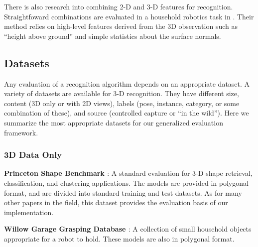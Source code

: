 There is also research into combining 2-D and 3-D features for recognition.
Straightfoward combinations are evaluated in a household robotics task in \cite{Gould2008}.
Their method relies on high-level features derived from the 3D observation such as ``height above ground'' and simple statistics about the surface normals.


\subsection{Datasets}
Any evaluation of a recognition algorithm depends on an appropriate dataset.
A variety of datasets are available for 3-D recognition.
They have different size, content (3D only or with 2D views), labels (pose, instance, category, or some combination of these), and source (controlled capture or ``in the wild'').
Here we summarize the most appropriate datasets for our generalized evaluation framework.

\subsubsection{3D Data Only}
{\bf Princeton Shape Benchmark \cite{Shilane2004}}:
A standard evaluation for 3-D shape retrieval, classification, and clustering applications.
The models are provided in polygonal format, and are divided into standard training and test datasets.
As for many other papers in the field, this dataset provides the evaluation basis of our implementation.

{\bf Willow Garage Grasping Database \cite{wgdb}}:
A collection of small household objects appropriate for a robot to hold.
These models are also in polygonal format.

